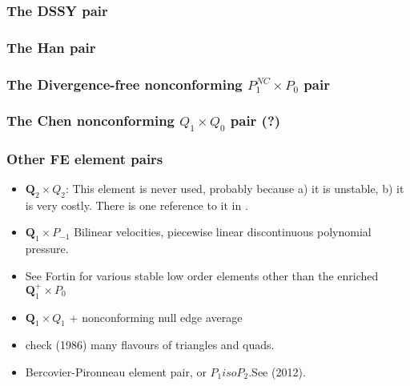 \subsubsection{The DSSY pair} \label{ss:pair_dssy2D}


\subsubsection{The Han pair} \label{ss:han}


\subsubsection{The Divergence-free nonconforming $P_1^{NC}\times P_0$ pair} \label{ss:p1ncp0}


\subsubsection{The Chen nonconforming ${ Q}_1\times Q_0$ pair (?)} \label{ss:chenq0}


\subsubsection{Other FE element pairs}

\begin{itemize}

\item ${\bm Q}_2\times Q_2$: This element is never used, probably because 
a) it is unstable, b) it is very costly. 
There is one reference to it in \cite{hufb86}.

\item ${\bm Q}_1\times P_{-1}$ Bilinear velocities,  piecewise linear discontinuous polynomial pressure.

\item See Fortin \cite{fort81} for various stable low order elements other than the enriched 
${\bm Q}_1^+ \times P_0$

\item ${\bm Q}_1\times Q_1$ + nonconforming null edge average \cite{fros07}

\item check \textcite{dhhu86} (1986) many flavours of triangles and quads.

\item Bercovier-Pironneau element pair, or $P_1isoP_2$.See \textcite{bocg12} (2012).

\end{itemize}


